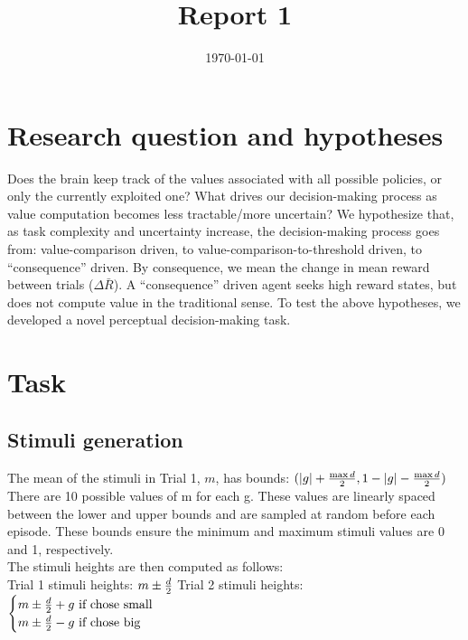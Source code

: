 \documentclass[11pt]{article}
\date{\today}
\title{Report 1}
\begin{document}
\maketitle
\tableofcontents

\section{Research question and hypotheses}
\label{sec:org26accf7}
Does the brain keep track of the values associated with all possible policies, or only the currently exploited one? What drives our decision-making process as value computation becomes less tractable/more uncertain? We hypothesize that, as task complexity and uncertainty increase, the decision-making process goes from: value-comparison driven, to value-comparison-to-threshold driven, to ``consequence'' driven. By consequence, we mean the change in mean reward between trials (\(\Delta \bar{R}\)). A ``consequence'' driven agent seeks high reward states, but does not compute value in the traditional sense.
To test the above hypotheses, we developed a novel perceptual decision-making task.
\section{Task}
\label{sec:org5f63883}
\subsection{Stimuli generation}
\label{sec:orgf5475db}
The mean of the stimuli in Trial 1, \(m\), has bounds: \(\\ ( |g| + \frac{\max d}{2} , 1 - |g| - \frac{\max d}{2} )\) \\
There are 10 possible values of m for each g. These values are linearly spaced between the lower and upper bounds and are sampled at random before each episode. These bounds ensure the minimum and maximum stimuli values are 0 and 1, respectively. \\

The stimuli heights are then computed as follows: \\
Trial 1 stimuli heights: \(m \pm \frac{d}{2} \\\)
Trial 2 stimuli heights: \(\begin{cases}
                                                m \pm \frac{d}{2} + g \text{ if chose small}  \\
                                                m \pm \frac{d}{2} - g \text{ if chose big}
                                                \end{cases}
                                                \\\)
\end{document}
